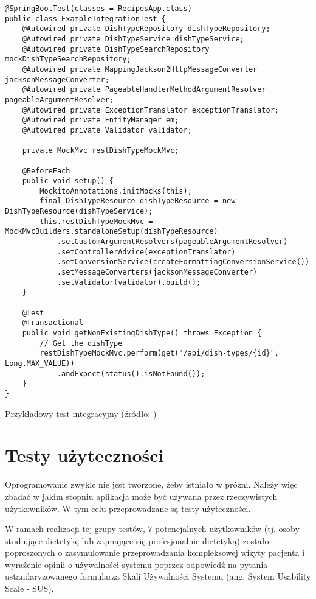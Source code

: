 \begin{listing}[h!]
\begin{verbatim}
@SpringBootTest(classes = RecipesApp.class)
public class ExampleIntegrationTest {
    @Autowired private DishTypeRepository dishTypeRepository;
    @Autowired private DishTypeService dishTypeService;
    @Autowired private DishTypeSearchRepository mockDishTypeSearchRepository;
    @Autowired private MappingJackson2HttpMessageConverter jacksonMessageConverter;
    @Autowired private PageableHandlerMethodArgumentResolver pageableArgumentResolver;
    @Autowired private ExceptionTranslator exceptionTranslator;
    @Autowired private EntityManager em;
    @Autowired private Validator validator;

    private MockMvc restDishTypeMockMvc;

    @BeforeEach
    public void setup() {
        MockitoAnnotations.initMocks(this);
        final DishTypeResource dishTypeResource = new DishTypeResource(dishTypeService);
        this.restDishTypeMockMvc = MockMvcBuilders.standaloneSetup(dishTypeResource)
            .setCustomArgumentResolvers(pageableArgumentResolver)
            .setControllerAdvice(exceptionTranslator)
            .setConversionService(createFormattingConversionService())
            .setMessageConverters(jacksonMessageConverter)
            .setValidator(validator).build();
    }

    @Test
    @Transactional
    public void getNonExistingDishType() throws Exception {
        // Get the dishType
        restDishTypeMockMvc.perform(get("/api/dish-types/{id}", Long.MAX_VALUE))
            .andExpect(status().isNotFound());
    }
}
\end{verbatim}
    \centering\caption{Przykładowy test integracyjny (źródło: \ownwork)}\label{listing:integration-test}
\end{listing}

\section{Testy użyteczności}

Oprogramowanie zwykle nie jest tworzone, żeby istniało w próżni.
Należy więc zbadać w jakim stopniu aplikacja może być używana przez rzeczywistych użytkowników.
W tym celu przeprowadzane są testy użyteczności\cite{book:testowanie-i-jakosc-oprogramowania}.

\par
W ramach realizacji tej grupy testów, 7 potencjalnych użytkowników (tj. osoby studiujące dietetykę lub zajmujące się profesjonalnie dietetyką)
zostało poproszonych o zasymulowanie przeprowadzania kompleksowej wizyty pacjenta
i wyrażenie opinii o używalności systemu poprzez odpowiedź na pytania ustandaryzowanego formularza Skali Używalności Systemu (ang. System Usability Scale - SUS)\cite{url:sus}.

